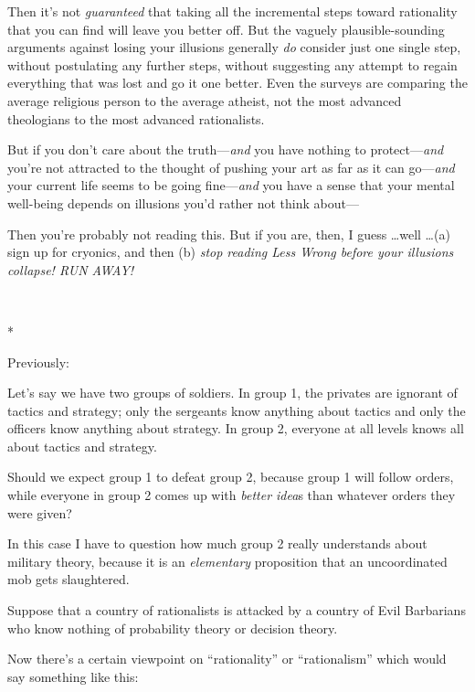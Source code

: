 {
 Then it's not \textit{guaranteed} that taking all
the incremental steps toward rationality that you can find will leave
you better off. But the vaguely plausible-sounding arguments against
losing your illusions generally \textit{do} consider just one single
step, without postulating any further steps, without suggesting any
attempt to regain everything that was lost and go it one better. Even
the surveys are comparing the average religious person to the average
atheist, not the most advanced theologians to the most advanced
rationalists.}

{
 But if you don't care about the
truth---\textit{and} you have nothing to protect---\textit{and}
you're not attracted to the thought of pushing your art
as far as it can go---\textit{and} your current life seems to be going
fine---\textit{and} you have a sense that your mental well-being
depends on illusions you'd rather not think about---}

{
 Then you're probably not reading this. But if you
are, then, I guess \ldots well \ldots (a) sign up for cryonics, and then
(b) \textit{stop reading Less Wrong before your illusions collapse! RUN
AWAY!}}

{\centering
 \ ~
\par}

{\centering
 *
\par}


{
 Previously:}

{
 Let's say we have two groups of soldiers. In group
1, the privates are ignorant of tactics and strategy; only the
sergeants know anything about tactics and only the officers know
anything about strategy. In group 2, everyone at all levels knows all
about tactics and strategy.}

{
 Should we expect group 1 to defeat group 2, because group 1 will
follow orders, while everyone in group 2 comes up with \textit{better
idea}s than whatever orders they were given?}

{
 In this case I have to question how much group 2 really
understands about military theory, because it is an \textit{elementary}
proposition that an uncoordinated mob gets slaughtered.}

{
 Suppose that a country of rationalists is attacked by a country of
Evil Barbarians who know nothing of probability theory or decision
theory.}

{
 Now there's a certain viewpoint on
``rationality'' or
``rationalism'' which would say
something like this:}

